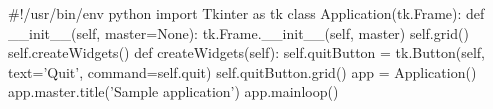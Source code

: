 \documentclass{article}
\begin{document}
\begin{python}
#!/usr/bin/env python
import Tkinter as tk
class Application(tk.Frame):
def __init__(self, master=None):
tk.Frame.__init__(self, master)
self.grid()
self.createWidgets()
def createWidgets(self):
self.quitButton = tk.Button(self, text='Quit',
command=self.quit)
self.quitButton.grid()
app = Application()
app.master.title('Sample application')
app.mainloop()
\end{python}
\end{document}
